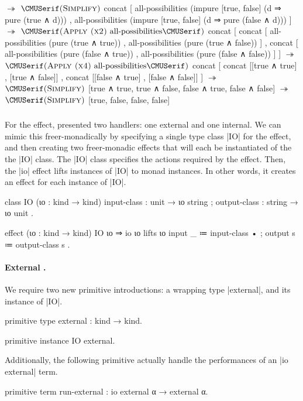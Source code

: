 \newpage

\begin{snippet}
$↠$ $\ruleapp{Simplify}$
concat
  [ all-possibilities
      (impure [true, false] (d ⇒
        pure (true ∧ d)))
  , all-possibilities
      (impure [true, false] (d ⇒
        pure (false ∧ d))) ]
$↠$ $\ruleappwith{Apply (x2)}{all-possibilities}$
concat
  [ concat
      [ all-possibilities (pure (true  ∧ true))
      , all-possibilities (pure (true  ∧ false)) ]
  , concat
      [ all-possibilities (pure (false ∧ true))
      , all-possibilities (pure (false ∧ false)) ] ]
$↠$ $\ruleappwith{Apply (x4)}{all-possibilities}$
concat
  [ concat [[true  ∧ true] , [true  ∧ false]]
  , concat [[false ∧ true] , [false ∧ false]] ]
$↠$ $\ruleapp{Simplify}$
[true ∧ true, true ∧ false, false ∧ true, false ∧ false]
$↠$ $\ruleapp{Simplify}$
[true, false, false, false]
\end{snippet}

\subsubsection{\IO}

For the \IO effect, \LangD presented two handlers: one external and one internal.
We can mimic this freer-monadically by specifying a single type class \code|IO| for the \IO effect, and then creating two freer-monadic effects that will each be instantiated of the the \code|IO| class.
The \code|IO| class specifies the actions required by the \IO effect.
Then, the \code|io| effect lifts instances of \code|IO| to monad instances.
In other words, it creates an effect for each instance of \code|IO|.
\begin{program}
class IO (ιο : kind → kind)
  { input-class  : unit → ιο string
  ; output-class : string → ιο unit }.

effect (ιο : kind → kind) {IO ιο} ⇒ io ιο
 lifts ιο
  { input  _ ≔ input-class •
  ; output s ≔ output-class s }.
\end{program}

\paragraph{External \IO.}
We require two new primitive introductions: a wrapping type \code|external|, and its instance of \code|IO|.
\begin{program}
primitive type external : kind → kind.

primitive instance IO external.
\end{program}
Additionally, the following primitive actually handle the performances of an \code|io external| term.
\begin{program}
primitive term run-external : io external α → external α.
\end{program}

